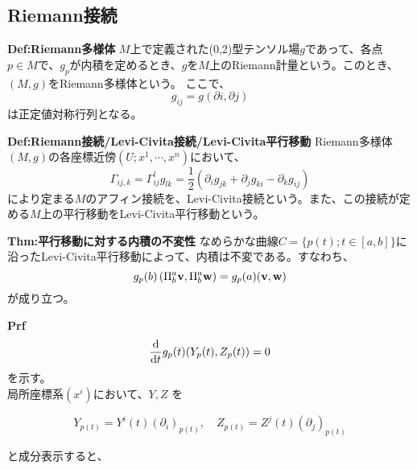 \documentclass[a4paper,11pt]{jsarticle}
\numberwithin{equation}{section}
\begin{document}
\subsection{Riemann接続}
\begin{itembox}[l]{\textbf{Def:Riemann多様体}}
    $M$上で定義された(0,2)型テンソル場$g$であって、各点$p \in M$で、$g_p$が内積を定めるとき、$g$を$M$上のRiemann計量という。このとき、$(M,g)$をRiemann多様体という。
    ここで、
    \begin{equation}
        g_{ij} = g(\partial{i},\partial{j})
    \end{equation}
    は正定値対称行列となる。
\end{itembox}

\begin{itembox}[l]{\textbf{Def:Riemann接続/Levi-Civita接続/Levi-Civita平行移動}}
    Riemann多様体$(M,g)$の各座標近傍$(U;x^1,\cdots,x^n)$において、
    \begin{equation}
        \Gamma_{ij,k} = \Gamma_{ij}^l g_{lk}=\frac{1}{2}(\partial_i g_{jk} + \partial_j g_{ki} - \partial_k g_{ij})
    \end{equation}
    により定まる$M$のアフィン接続を、Levi-Civita接続という。また、この接続が定める$M$上の平行移動をLevi-Civita平行移動という。  

\end{itembox}

\begin{itembox}[l]{\textbf{Thm:平行移動に対する内積の不変性}}
    なめらかな曲線$C = \{p(t) ; t \in [a,b]\}$に沿ったLevi-Civita平行移動によって、内積は不変である。すなわち、
    \begin{equation}
        g_p(b)\left(\Pi_b^a \vb{v},\Pi_b^a \vb{w}\right) = g_p(a)(\vb{v},\vb{w})
    \end{equation}
    が成り立つ。
\end{itembox}
\textbf{Prf}\\
\begin{align}
    \dv{t}g_p(t)(Y_p(t),Z_p(t)) =0
\end{align}
を示す。\\

局所座標系$(x^i)$において、$Y, Z$ を

\begin{equation}
    Y_{p(t)} = Y^i(t) (\partial_i)_{p(t)}, \quad Z_{p(t)} = Z^j(t) (\partial_j)_{p(t)}
\end{equation}

と成分表示すると、
\end{document}
